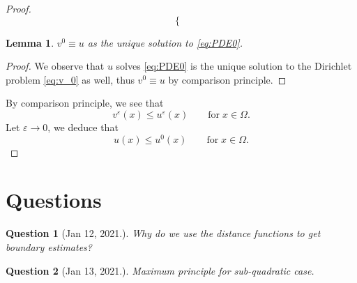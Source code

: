 \documentclass[11pt,reqno]{amsart}
\numberwithin{figure}{section}
\theoremstyle{plain}
\newtheorem{quest}{Question}
\newtheorem{lem}[thm]{Lemma}
\theoremstyle{remark}
\numberwithin{equation}{section}
\begin{document}
\begin{proof}
\begin{equation}
\begin{cases}
\end{cases}
\end{equation}
\begin{lem} $v^0\equiv u$ as the unique solution to \eqref{eq:PDE0}.
\end{lem}
\begin{proof} We observe that $u$ solves \eqref{eq:PDE0} is the unique solution to the Dirichlet problem \eqref{eq:v_0} as well, thus $v^0 \equiv u$ by comparison principle.
\end{proof}
\noindent By comparison principle, we see that
\begin{equation*}
    v^\varepsilon(x)\leq u^\varepsilon(x) \qquad\text{for}\;x\in \Omega.
\end{equation*}
Let $\varepsilon\to 0$, we deduce that
\begin{equation*}
    u(x)\leq u^0(x) \qquad\text{for}\;x\in \Omega.
\end{equation*}
\end{proof}
\color{black}






\section{Questions}
\begin{quest} [Jan 12, 2021.] Why do we use the distance functions to get boundary estimates? 
\end{quest}

\begin{quest} [Jan 13, 2021.] Maximum principle for sub-quadratic case.
\end{quest}
\end{document}
